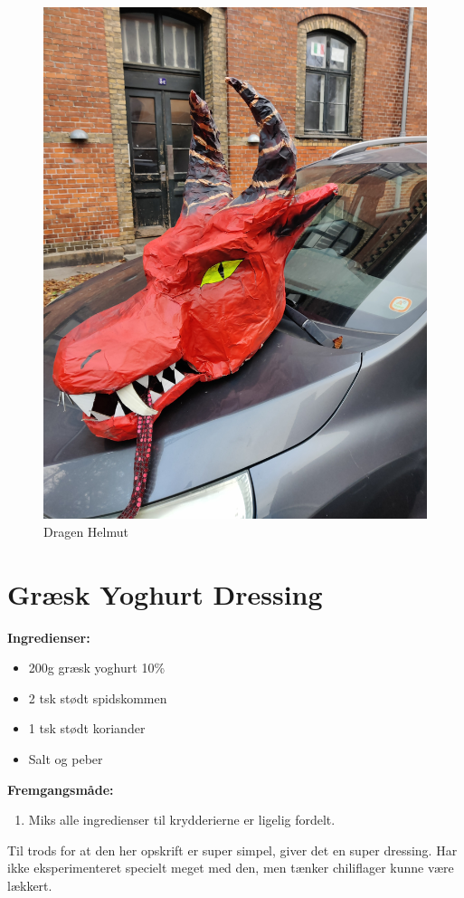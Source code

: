 \documentclass{book}
\begin{document}
\begin{figure}
    \centering
    \includegraphics[width=0.5\linewidth]{Helmut.jpg}
    \caption{Dragen Helmut}
  
\end{figure}
\newpage \section{Græsk Yoghurt Dressing}
\begin{minipage}[t]{0.5\textwidth}
\textbf{Ingredienser:}
 \begin{itemize}
        \item 200g græsk yoghurt 10\%
        \item 2 tsk stødt spidskommen
        \item 1 tsk stødt koriander
        \item Salt og peber
    \end{itemize}
\end{minipage}
\begin{minipage}[t]{0.5\textwidth}
\textbf{Fremgangsmåde:}
\begin{enumerate}
    \item Miks alle ingredienser til krydderierne er ligelig fordelt.
\end{enumerate}
\end{minipage}
Til trods for at den her opskrift er super simpel, giver det en super dressing. Har ikke eksperimenteret specielt meget med den, men tænker chiliflager kunne være lækkert.
\newpage 
\end{document}
